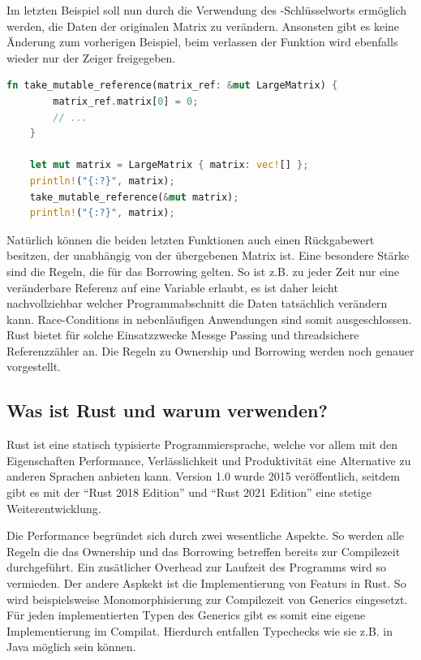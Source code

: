 \documentclass[11pt,a4paper, ngerman]{article}
\begin{document}
Im letzten Beispiel soll nun durch die Verwendung des -Schlüsselworts ermöglich werden, die Daten der originalen Matrix zu verändern. Ansonsten gibt es keine Änderung zum vorherigen Beispiel, beim verlassen der Funktion wird ebenfalls wieder nur der Zeiger freigegeben.

\begin{lstlisting}[language=rust, caption={Einführendes Beispiel Veränderliche Referenz}]
    fn take_mutable_reference(matrix_ref: &mut LargeMatrix) {
        matrix_ref.matrix[0] = 0;
        // ...
    }

    let mut matrix = LargeMatrix { matrix: vec![] };
    println!("{:?}", matrix);
    take_mutable_reference(&mut matrix);
    println!("{:?}", matrix);
\end{lstlisting}

Natürlich können die beiden letzten Funktionen auch einen Rückgabewert besitzen, der unabhängig von der übergebenen Matrix ist. Eine besondere Stärke sind die Regeln, die für das Borrowing gelten. So ist z.B. zu jeder Zeit nur eine veränderbare Referenz auf eine Variable erlaubt, es ist daher leicht nachvollziehbar welcher Programmabschnitt die Daten tatsächlich verändern kann. Race-Conditions in nebenläufigen Anwendungen sind somit ausgeschlossen. Rust bietet für solche Einsatzzwecke Messge Passing \cite{K1727} und threadsichere Referenzzähler \cite{ArcSrc} an. Die Regeln zu Ownership und Borrowing werden noch genauer vorgestellt.

\subsection{Was ist Rust und warum verwenden?}
Rust ist eine statisch typisierte Programmiersprache, welche vor allem mit den Eigenschaften Performance, Verlässlichkeit und Produktivität eine Alternative zu anderen Sprachen anbieten kann. Version 1.0 wurde 2015 veröffentlich, seitdem gibt es mit der ``Rust 2018 Edition'' und ``Rust 2021 Edition'' eine stetige Weiterentwicklung.

Die Performance begründet sich durch zwei wesentliche Aspekte. So werden alle Regeln die das Ownership und das Borrowing betreffen bereits zur Compilezeit durchgeführt. Ein zusätlicher Overhead zur Laufzeit des Programms wird so vermieden. Der andere Aspkekt ist die Implementierung von Featurs in Rust. So wird beispielsweise Monomorphisierung zur Compilezeit von Generics eingesetzt. Für jeden implementierten Typen des Generics gibt es somit eine eigene Implementierung im Compilat. Hierdurch entfallen Typechecks wie sie z.B. in Java möglich sein können.
\end{document}

